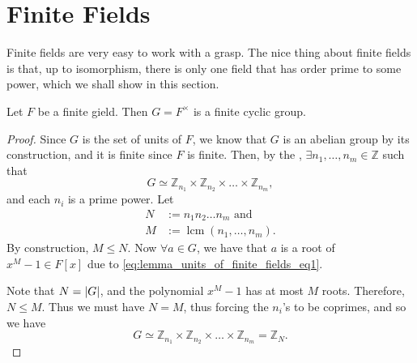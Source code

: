 \documentclass[notoc,notitlepage]{tufte-book}
\DeclareMathOperator{\lcm}{lcm}
\begin{document}
\section{Finite Fields}%
\label{sec:finite_fields}

Finite fields are very easy to work with a grasp. The nice thing about finite fields is
that, up to isomorphism, there is only one field that has order prime to some power, which
we shall show in this section.

\begin{lemma}\label{lemma:units_of_a_finite_field_form_a_finite_cyclic_group}
  Let $F$ be a finite gield. Then $G = F^\times$ is a finite cyclic group.
\end{lemma}

\begin{proof}
  Since $G$ is the set of units of $F$, we know that $G$ is an abelian group by its
  construction, and it is finite since $F$ is finite. Then, by the , $\exists n_1, \ldots, n_m \in \mathbb{Z}$ such that
  \begin{equation}\label{eq:lemma_units_of_finite_fields_eq1}
    G \simeq \mathbb{Z}_{n_1} \times \mathbb{Z}_{n_2} \times \hdots \times
    \mathbb{Z}_{n_m},
  \end{equation}
  and each $n_i$ is a prime power. Let
  \begin{align*}
    N &:= n_1 n_2 \hdots n_m \text{ and } \\
    M &:= \lcm(n_1, \ldots, n_m).
  \end{align*}
  By construction, $M \leq N$. Now $\forall a \in G$, we have that $a$ is a root of $x^M -
  1 \in F[x]$ due to \cref{eq:lemma_units_of_finite_fields_eq1}.
  
  Note that $N = \left|G\right|$, and the polynomial $x^M - 1$ has at most $M$ roots. Therefore,
  $N \leq M$. Thus we must have $N = M$, thus forcing the $n_i$'s to be coprimes, and so
  we have
  \begin{equation*}
    G \simeq \mathbb{Z}_{n_1} \times \mathbb{Z}_{n_2} \times \hdots \times
    \mathbb{Z}_{n_m} = \mathbb{Z}_N.
  \end{equation*}
\end{proof}
\end{document}
